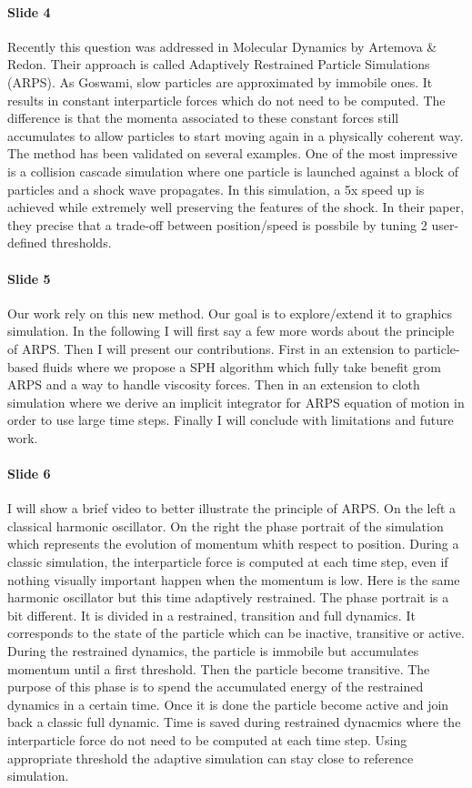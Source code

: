 \documentclass[twocolumn]{article}
\begin{document}
\paragraph{Slide 4}
Recently this question was addressed in Molecular Dynamics by Artemova \& Redon. 
Their approach is called Adaptively Restrained Particle Simulations (ARPS).
As Goswami, slow particles are approximated by immobile ones.
It results in constant interparticle forces which do not need to be computed.
The difference is that the momenta associated to these constant forces still accumulates to allow particles to start moving again in a physically coherent way.
The method has been validated on several examples.
One of the most impressive is a collision cascade simulation where one particle is launched against a block of particles and a shock wave propagates.
In this simulation, a 5x speed up is achieved while extremely well preserving the features of the shock. 
In their paper, they precise that a trade-off between position/speed is possbile by tuning 2 user-defined thresholds.
\paragraph{Slide 5}
Our work rely on this new method. 
Our goal is to explore/extend it to graphics simulation.
In the following I will first say a few more words about the principle of ARPS.
Then I will present our contributions.
First in an extension to particle-based fluids where we propose a SPH algorithm which fully take benefit grom ARPS and a way to handle viscosity forces.
Then in an extension to cloth simulation where we derive an implicit integrator for ARPS equation of motion in order to use large time steps.
Finally I will conclude with limitations and future work.
\paragraph{Slide 6}
I will show a brief video to better illustrate the principle of ARPS.
On the left a classical harmonic oscillator.
On the right the phase portrait of the simulation which represents the evolution of momentum whith respect to position.
During a classic simulation, the interparticle force is computed at each time step, even if nothing visually important happen when the momentum is low.
Here is the same harmonic oscillator but this time adaptively restrained.
The phase portrait is a bit different. 
It is divided in a restrained, transition and full dynamics.
It corresponds to the state of the particle which can be inactive, transitive or active.
During the restrained dynamics, the particle is immobile but accumulates momentum until a first threshold.
Then the particle become transitive.
The purpose of this phase is to spend the accumulated energy of the restrained dynamics in a certain time.
Once it is done the particle become active and join back a classic full dynamic.
Time is saved during restrained dynacmics where the interparticle force do not need to be computed at each time step.
Using appropriate threshold the adaptive simulation can stay close to reference simulation.
\end{document}
